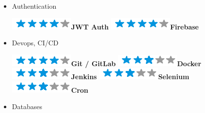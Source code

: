 \documentclass[]{friggeri-cv}
\begin{document}
\begin{flushleft}
\begin{multicols}{3}
\begin{itemize}
\item \large Authentication \
\normalsize
\begin{flushleft}

\includegraphics[scale=0.40]{res/img/4stars.png}\hspace{1.5mm}\textbf{JWT Auth}
\includegraphics[scale=0.40]{res/img/4stars.png}\hspace{1.5mm}\textbf{Firebase}
\end{flushleft}            

\item \large Devops, CI/CD \
\normalsize
\begin{flushleft}

\includegraphics[scale=0.40]{res/img/4stars.png}\hspace{1.5mm}\textbf{Git / GitLab}
\includegraphics[scale=0.40]{res/img/3stars.png}\hspace{1.5mm}\textbf{Docker}
\includegraphics[scale=0.40]{res/img/3stars.png}\hspace{1.5mm}\textbf{Jenkins}
\includegraphics[scale=0.40]{res/img/3stars.png}\hspace{1.5mm}\textbf{Selenium}
\includegraphics[scale=0.40]{res/img/3stars.png}\hspace{1.5mm}\textbf{Cron}
\end{flushleft}            

\columnbreak
\item \large Databases \
\normalsize
\begin{flushleft}


\end{flushleft}
\end{itemize}
\end{multicols}
\end{flushleft}
\end{document}
